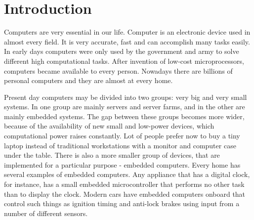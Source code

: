 \newpage
\section{Introduction}




% 


% 
% 
% 
% 
% 
% 





Computers are very essential in our life. Computer is an electronic device
used in almost every field. It is very accurate, fast and can accomplish
many tasks easily. In early days computers were only used by the government
and army to solve different high computational tasks. After invention of
low-cost microprocessors, computers became available to every person. Nowadays  
there are billions of personal computers and they are almost at every home.

Present day computers may be divided into two groups: very big and very small systems. In one group are mainly servers and
server farms, and in the other are mainly embedded systems. 
The gap between these groups becomes more wider, because of the availability of new small and low-power devices, which computational power raises constantly.
Lot of people prefer now to buy a tiny laptop instead of traditional workstations with a monitor and computer case under the table.
There is also a more smaller group of devices, that are implemented for a particular purpose - embedded computers.  
Every home has several examples of embedded computers.
Any appliance that has a digital clock, for instance, has a small embedded microcontroller that performs no other task than to display the clock.
Modern cars have embedded computers onboard that control such things as ignition timing and anti-lock brakes using input from a number of different sensors.


